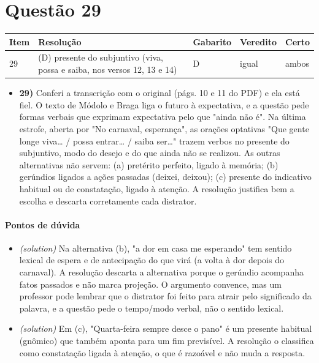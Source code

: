 \documentclass{article}%
\begin{document}
\section*{Questão 29}%
\begin{longtable}{@{}p{} p{} p{} p{} p{}@{}}\toprule Item & Resolução & Gabarito & Veredito & Certo \\ \midrule
29 & (D) presente do subjuntivo (viva, possa e saiba, nos versos 12, 13 e 14) & D & igual & ambos \\
\bottomrule\end{longtable}%
\begin{itemize}%
\item%
\textbf{29)} Conferi a transcrição com o original (págs. 10 e 11 do PDF) e ela está fiel. O texto de Módolo e Braga liga o futuro à expectativa, e a questão pede formas verbais que exprimam expectativa pelo que "ainda não é". Na última estrofe, aberta por "No carnaval, esperança", as orações optativas "Que gente longe viva\ldots{} / possa entrar\ldots{} / saiba ser\ldots{}" trazem verbos no presente do subjuntivo, modo do desejo e do que ainda não se realizou. As outras alternativas não servem: (a) pretérito perfeito, ligado à memória; (b) gerúndios ligados a ações passadas (deixei, deixou); (c) presente do indicativo habitual ou de constatação, ligado à atenção. A resolução justifica bem a escolha e descarta corretamente cada distrator.%
\end{itemize}%
\paragraph{Pontos de dúvida}%
\begin{itemize}%
\item%
\textit{(solution)} Na alternativa (b), "a dor em casa me esperando" tem sentido lexical de espera e de antecipação do que virá (a volta à dor depois do carnaval). A resolução descarta a alternativa porque o gerúndio acompanha fatos passados e não marca projeção. O argumento convence, mas um professor pode lembrar que o distrator foi feito para atrair pelo significado da palavra, e a questão pede o tempo/modo verbal, não o sentido lexical.%
\item%
\textit{(solution)} Em (c), "Quarta{-}feira sempre desce o pano" é um presente habitual (gnômico) que também aponta para um fim previsível. A resolução o classifica como constatação ligada à atenção, o que é razoável e não muda a resposta.%
\end{itemize}%
\end{document}
